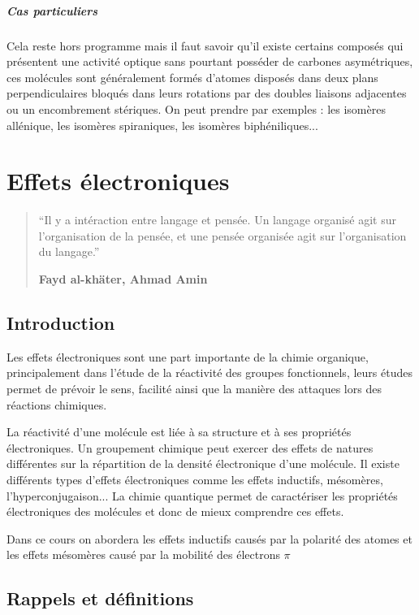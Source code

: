 \documentclass[a4paper, oneside]{book}
\begin{document}
\subsubsection{Cas particuliers}
Cela reste hors programme mais il faut savoir qu'il existe certains composés qui présentent une activité optique sans pourtant posséder de carbones asymétriques, ces molécules sont généralement formés d'atomes disposés dans deux plans perpendiculaires bloqués dans leurs rotations par des doubles liaisons adjacentes ou un encombrement stériques. On peut prendre par exemples : les isomères allénique, les isomères spiraniques, les isomères biphéniliques...
\part{Effets électroniques}
\begin{quotation}
\vspace*{7cm}
\LARGE{“Il y a intéraction entre langage et pensée. Un langage organisé agit sur l'organisation de la pensée, et une pensée organisée agit sur l'organisation du langage.”\\
\begin{center}
    \textbf{Fayd al-khäter, Ahmad Amin}
\end{center}}
\end{quotation}
\chapter{Introduction}
Les effets électroniques sont une part importante de la chimie organique, principalement dans l'étude de la réactivité des groupes fonctionnels, leurs études permet de prévoir le sens, facilité ainsi que la manière des attaques lors des réactions chimiques. 

La réactivité d'une molécule est liée à sa structure et à ses propriétés électroniques. Un groupement chimique peut exercer des effets de natures différentes sur la répartition de la densité électronique d'une molécule. Il existe différents types d'effets électroniques comme les effets inductifs, mésomères, l'hyperconjugaison... La chimie quantique permet de caractériser les propriétés électroniques des molécules et donc de mieux comprendre ces effets.

Dans ce cours on abordera les effets inductifs causés par la polarité des atomes et les effets mésomères causé par la mobilité des électrons $\pi$
\chapter{Rappels et définitions}
\minitoc
\end{document}
